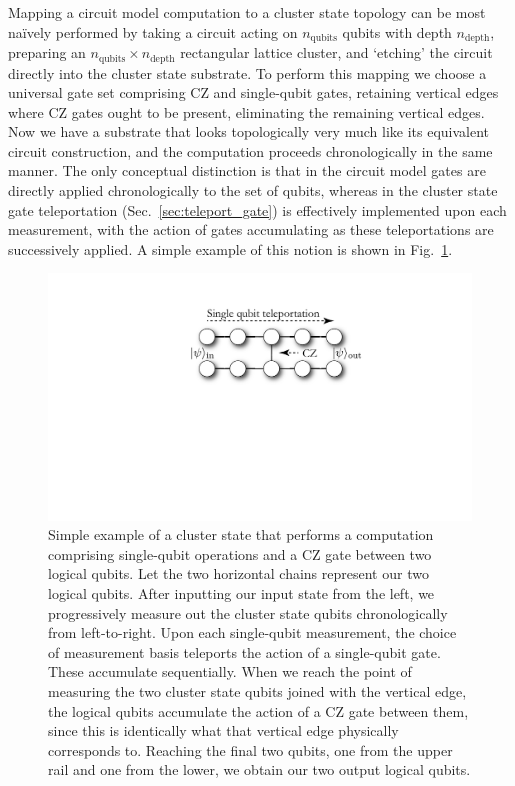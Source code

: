 \documentclass[aps, rmp, twocolumn, amsmath, amssymb, nofootinbib, superscriptaddress, longbibliography, floatfix, table-of-contents, eqsecnum]{revtex4-1}
\begin{document}
Mapping a circuit model computation to a cluster state topology can be most na{\" i}vely performed by taking a circuit acting on $n_\text{qubits}$ qubits with depth $n_\text{depth}$, preparing an \mbox{$n_\text{qubits}\times n_\text{depth}$} rectangular lattice cluster, and `etching' the circuit directly into the cluster state substrate. To perform this mapping we choose a universal gate set comprising CZ and single-qubit gates, retaining vertical edges where CZ gates ought to be present, eliminating the remaining vertical edges. Now we have a substrate that looks topologically very much like its equivalent circuit construction, and the computation proceeds chronologically in the same manner. The only conceptual distinction is that in the circuit model gates are directly applied chronologically to the set of qubits, whereas in the cluster state gate teleportation (Sec.~\ref{sec:teleport_gate}) is effectively implemented upon each measurement, with the action of gates accumulating as these teleportations are successively applied. A simple example of this notion is shown in Fig.~\ref{fig:cluster_state_circuit}.

\begin{figure}[!htb]
	\includegraphics[width=0.75\columnwidth]{cluster_state_circuit}
	\caption{Simple example of a cluster state that performs a computation comprising single-qubit operations and a CZ gate between two logical qubits. Let the two horizontal chains represent our two logical qubits. After inputting our input state from the left, we progressively measure out the cluster state qubits chronologically from left-to-right. Upon each single-qubit measurement, the choice of measurement basis teleports the action of a single-qubit gate. These accumulate sequentially. When we reach the point of measuring the two cluster state qubits joined with the vertical edge, the logical qubits accumulate the action of a CZ gate between them, since this is identically what that vertical edge physically corresponds to. Reaching the final two qubits, one from the upper rail and one from the lower, we obtain our two output logical qubits.} \label{fig:cluster_state_circuit}
\end{figure}
\end{document}
